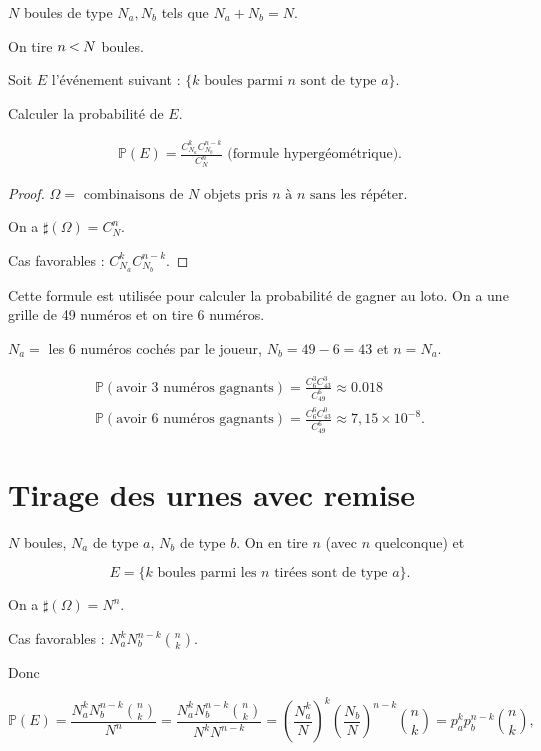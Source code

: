 \documentclass[french]{book}
\theoremstyle{definition}
\theoremstyle{remark}
\newcommand{\lesss}{\rotatebox[origin=c]{90}{$\land$}}
\newcommand{\less}{\ \lesss\ }
\begin{document}
$N$ boules de type $N_a, N_b$ tels que $N_a + N_b = N$.

On tire $n \less N$ boules.

Soit $E$ l'événement suivant : $\{ k \text{ boules parmi } n \text{ sont de type } a \}$.

Calculer la probabilité de $E$.

\begin{gather*}
  \mathbb{P}( E ) = \frac{C _{N_a} ^{k} C _{N_b} ^{n-k}}{C_N ^{n}} \text{ (formule hypergéométrique).}
\end{gather*}

\begin{proof}
  $\Omega = \text{ combinaisons de } N \text{ objets pris } n \text{ à } n \text{ sans les répéter. }   $

  On a $\sharp(\Omega) = C_N ^{n}$.

  Cas favorables : $C _{N_a} ^{k} C _{N_b}^{n-k}$.
\end{proof}

Cette formule est utilisée pour calculer la probabilité de gagner au loto. On a une grille de 49 numéros et on tire 6 numéros.

$N_a =$ les 6 numéros cochés par le joueur, $N_b = 49-6 = 43$ et $n=N_a$.

\begin{gather*}
  \mathbb{P}( \text{avoir 3 numéros gagnants} ) = \frac{C^{3}_{6} C^{3}_{43}}{C^{6}_{49}} \approx 0.018 \\
  \mathbb{P}( \text{avoir 6 numéros gagnants} ) = \frac{C^{6}_{6} C^{0}_{43}}{C_{49}^{6}} \approx 7,15 \times 10 ^{-8}.
\end{gather*}

\section{Tirage des urnes avec remise}

$N$ boules, $N_a$ de type $a$, $N_b$ de type $b$. On en tire $n$ (avec $n$ quelconque) et

\begin{equation*}
  E = \{ k \text{ boules parmi les } n \text{ tirées sont de type } a  \}.
\end{equation*}

On a $\sharp(\Omega) = N ^{n}$.

Cas favorables : $N_a ^{k} N_b ^{n-k} \binom{n}{k}$.

Donc

\begin{equation*}
  \mathbb{P}( E ) = \frac{N_a ^{k} N_b ^{n-k} \binom{n}{k}}{N ^{n}} = \frac{N_a ^{k} N_b ^{n-k} \binom{n}{k}}{N ^{k} N ^{n-k}} = \left( \frac{N_a ^{k}}{N}\right) ^{k} \left( \frac{N_b}{N}\right) ^{n-k} \binom{n}{k} = p_a ^{k} p_b ^{n-k} \binom{n}{k},
\end{equation*}
\end{document}
